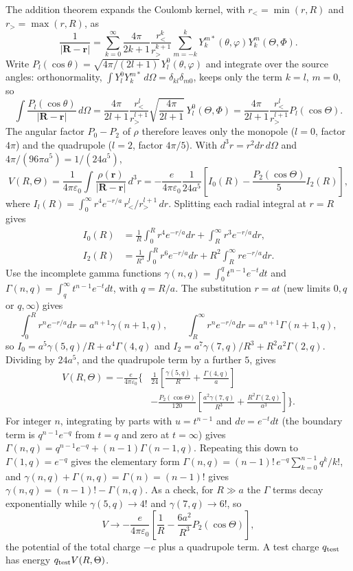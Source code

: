 The addition theorem expands the Coulomb kernel, with
$r_<=\min(r,R)$ and $r_>=\max(r,R)$, as
\[
\frac1{|\mathbf R-\mathbf r|}=\sum_{k=0}^\infty
\frac{4\pi}{2k+1}\frac{r_<^k}{r_>^{k+1}}
\sum_{m=-k}^{k}Y_k^{m*}(\theta,\varphi)Y_k^m(\Theta,\Phi).
\]
Write $P_l(\cos\theta)=\sqrt{4\pi/(2l+1)}\,Y_l^0(\theta,\varphi)$
and integrate over the source angles: orthonormality,
$\int Y_l^0Y_k^{m*}\,d\Omega=\delta_{kl}\delta_{m0}$, keeps only
the term $k=l$, $m=0$, so
\[
\int\frac{P_l(\cos\theta)}{|\mathbf R-\mathbf r|}\,d\Omega
=\frac{4\pi}{2l+1}\frac{r_<^l}{r_>^{l+1}}
\sqrt{\frac{4\pi}{2l+1}}\,Y_l^0(\Theta,\Phi)
=\frac{4\pi}{2l+1}\frac{r_<^l}{r_>^{l+1}}P_l(\cos\Theta).
\]
The angular factor $P_0-P_2$ of $\rho$ therefore leaves only the
monopole ($l=0$, factor $4\pi$) and the quadrupole ($l=2$, factor
$4\pi/5$). With $d^3r=r^2dr\,d\Omega$ and
$4\pi/(96\pi a^5)=1/(24a^5)$,
\[
V(R,\Theta)=\frac1{4\pi\varepsilon_0}
\int\frac{\rho(\mathbf r)}{|\mathbf R-\mathbf r|}\,d^3r
=-\frac{e}{4\pi\varepsilon_0}\frac1{24a^5}
\left[I_0(R)-\frac{P_2(\cos\Theta)}5I_2(R)\right],
\]
where $I_l(R)=\int_0^\infty r^4e^{-r/a}\,r_<^l/r_>^{l+1}\,dr$.
Splitting each radial integral at $r=R$ gives
\[
\begin{aligned}
I_0(R)&=\frac1R\int_0^R r^4e^{-r/a}dr
+\int_R^\infty r^3e^{-r/a}dr,\\
I_2(R)&=\frac1{R^3}\int_0^R r^6e^{-r/a}dr
+R^2\int_R^\infty re^{-r/a}dr.
\end{aligned}
\]
Use the incomplete gamma functions
$\gamma(n,q)=\int_0^qt^{n-1}e^{-t}dt$ and
$\Gamma(n,q)=\int_q^\infty t^{n-1}e^{-t}dt$, with $q=R/a$.
The substitution $r=at$ (new limits $0,q$ or $q,\infty$) gives
\[
\int_0^Rr^ne^{-r/a}dr=a^{n+1}\gamma(n+1,q),\qquad
\int_R^\infty r^ne^{-r/a}dr=a^{n+1}\Gamma(n+1,q),
\]
so $I_0=a^5\gamma(5,q)/R+a^4\Gamma(4,q)$ and
$I_2=a^7\gamma(7,q)/R^3+R^2a^2\Gamma(2,q)$. Dividing by $24a^5$,
and the quadrupole term by a further $5$, gives
\[
\boxed{\begin{aligned}
V(R,\Theta)=-\frac{e}{4\pi\varepsilon_0}
\bigg\{&
\frac1{24}\left[\frac{\gamma(5,q)}R+
\frac{\Gamma(4,q)}a\right]\\
&-\frac{P_2(\cos\Theta)}{120}
\left[\frac{a^2\gamma(7,q)}{R^3}
+\frac{R^2\Gamma(2,q)}{a^3}\right]\bigg\}.
\end{aligned}}
\]
For integer $n$, integrating by parts with $u=t^{n-1}$ and
$dv=e^{-t}dt$ (the boundary term is $q^{n-1}e^{-q}$ from $t=q$ and
zero at $t=\infty$) gives
$\Gamma(n,q)=q^{n-1}e^{-q}+(n-1)\Gamma(n-1,q)$. Repeating this down
to $\Gamma(1,q)=e^{-q}$ gives the elementary form
$\Gamma(n,q)=(n-1)!\,e^{-q}\sum_{k=0}^{n-1}q^k/k!$, and
$\gamma(n,q)+\Gamma(n,q)=\Gamma(n)=(n-1)!$ gives
$\gamma(n,q)=(n-1)!-\Gamma(n,q)$. As a check, for $R\gg a$ the
$\Gamma$ terms decay exponentially while $\gamma(5,q)\to4!$ and
$\gamma(7,q)\to6!$, so
\[
V\to-\frac{e}{4\pi\varepsilon_0}
\left[\frac1R-\frac{6a^2}{R^3}P_2(\cos\Theta)\right],
\]
the potential of the total charge $-e$ plus a quadrupole term.
A test charge $q_{\rm test}$ has energy $q_{\rm test}V(R,\Theta)$.

